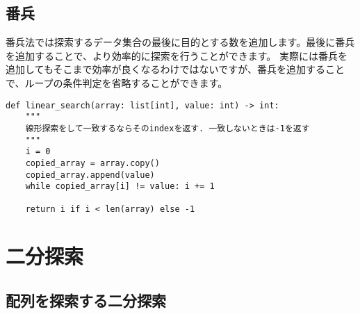 \documentclass{jlreq}
\begin{document}
\subsection{番兵}

番兵法では探索するデータ集合の最後に目的とする数を追加します。最後に番兵を追加することで、より効率的に探索を行うことができます。
実際には番兵を追加してもそこまで効率が良くなるわけではないですが、番兵を追加することで、ループの条件判定を省略することができます。

\vspace{0.5cm}

\begin{center}
\end{center}

\begin{lstlisting}[caption=番兵の実装, frame=TRBL, label={sentinel}]
def linear_search(array: list[int], value: int) -> int:
    """
    線形探索をして一致するならそのindexを返す. 一致しないときは-1を返す
    """
    i = 0
    copied_array = array.copy()
    copied_array.append(value)
    while copied_array[i] != value: i += 1
    
    return i if i < len(array) else -1
  \end{lstlisting}

\section{二分探索}

\subsection{配列を探索する二分探索}
\end{document}

